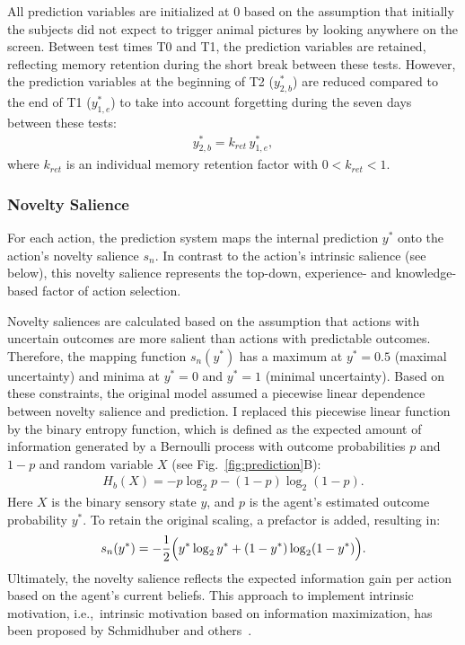 \documentclass[a4paper]{scrreprt}
\begin{document}
All prediction variables are initialized at 0 based on the assumption that initially the subjects did not expect to trigger animal pictures by looking anywhere on the screen. Between test times T0 and T1, the prediction variables are retained, reflecting memory retention during the short break between these tests. However, the prediction variables at the beginning of T2 ($y^*_{2,b}$) are reduced compared to the end of T1 ($y^*_{1,e}$) to take into account forgetting during the seven days between these tests:
\begin{align}
y^*_{2,b} = k_{ret}\, y^*_{1,e},
\end{align}
where $k_{ret}$ is an individual memory retention factor with $0<k_{ret}<1$.


\subsubsection{Novelty Salience}

For each action, the prediction system maps the internal prediction $y^*$ onto the action's novelty salience $s_n$. In contrast to the action's intrinsic salience (see below), this novelty salience represents the top-down, experience- and knowledge-based factor of action selection.

Novelty saliences are calculated based on the assumption that actions with uncertain outcomes are more salient than actions with predictable outcomes. Therefore, the mapping function $s_n(y^*)$ has a maximum at $y^*=0.5$ (maximal uncertainty) and minima at $y^*=0$ and $y^*=1$ (minimal uncertainty). Based on these constraints, the original model assumed a piecewise linear dependence between novelty salience and prediction. I replaced this piecewise linear function by the binary entropy function, which is defined as the expected amount of information generated by a Bernoulli process with outcome probabilities $p$ and $1-p$ and random variable $X$ (see Fig.~\ref{fig:prediction}B):
\begin{align}
H_b(X) = -p \log_2 p - (1-p) \log_2 (1-p).
\end{align}
Here $X$ is the binary sensory state $y$, and $p$ is the agent's estimated outcome probability $y^*$. To retain the original scaling, a prefactor is added, resulting in:
\begin{align}
s_n(y^*) = -\frac{1}{2} \Bigl( y^*\log_2 y^* + (1-y^*)\log_2 (1-y^*)\Bigr).
\end{align}
Ultimately, the novelty salience reflects the expected information gain per action based on the agent's current beliefs. This approach to implement intrinsic motivation, i.e.,~intrinsic motivation based on information maximization, has been proposed by Schmidhuber and others~\cite{schmidhuber91,schmidhuber91b,moulin-frier13}.
\end{document}
